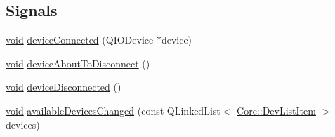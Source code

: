 \subsection*{Signals}
\begin{DoxyCompactItemize}
\item 
\hyperlink{group___u_a_v_objects_plugin_ga444cf2ff3f0ecbe028adce838d373f5c}{void} \hyperlink{group___core_plugin_gaba707f1aa2a0ecd087c4918a4840257b}{device\-Connected} (Q\-I\-O\-Device $\ast$device)
\item 
\hyperlink{group___u_a_v_objects_plugin_ga444cf2ff3f0ecbe028adce838d373f5c}{void} \hyperlink{group___core_plugin_gaa4ac1fd6464703c0215cf028f42beac5}{device\-About\-To\-Disconnect} ()
\item 
\hyperlink{group___u_a_v_objects_plugin_ga444cf2ff3f0ecbe028adce838d373f5c}{void} \hyperlink{group___core_plugin_ga8978f471105c4f9a5525a175db4b3f29}{device\-Disconnected} ()
\item 
\hyperlink{group___u_a_v_objects_plugin_ga444cf2ff3f0ecbe028adce838d373f5c}{void} \hyperlink{group___core_plugin_ga3b0173c58f1af7e9d1140fcbdd3afd18}{available\-Devices\-Changed} (const Q\-Linked\-List$<$ \hyperlink{class_core_1_1_dev_list_item}{Core\-::\-Dev\-List\-Item} $>$ devices)
\end{DoxyCompactItemize}
